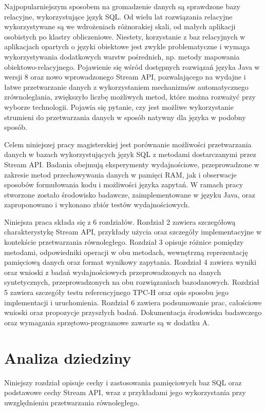 \documentclass[12pt,twoside,openright]{extarticle}
\begin{document}
    Najpopularniejszym sposobem na gromadzenie danych są sprawdzone bazy relacyjne, wykorzystujące język SQL. Od wielu lat rozwiązania relacyjne wykorzystywane są we wdrożeniach różnorakiej skali, od małych aplikacji osobistych po klastry obliczeniowe. Niestety, korzystanie z baz relacyjnych w aplikacjach opartych o języki obiektowe jest zwykle problematyczne i wymaga wykorzystywania dodatkowych warstw pośrednich, np. metody mapowania obiektowo-relacyjnego. Pojawienie się wśród dostępnych rozwiązań języka Java w wersji 8 oraz nowo wprowadzonego Stream API, pozwalającego na wydajne i łatwe przetwarzanie danych z wykorzystaniem mechanizmów automatycznego zrównoleglania, zwiększyło liczbę możliwych metod, które można rozważyć przy wyborze technologii. Pojawia się pytanie, czy jest możliwe wykorzystanie strumieni do przetwarzania danych w sposób natywny dla języka w podobny sposób.

	Celem niniejszej pracy magisterskiej jest porównanie możliwości przetwarzania danych w bazach wykorzystujących język SQL z metodami dostarczanymi przez Stream API. Badania obejmują eksperymenty wydajnościowe, przeprowadzone w zakresie metod przechowywania danych w pamięci RAM, jak i obserwacje sposobów formułowania kodu i możliwości języka zapytań. W ramach pracy stworzone zostało środowisko badawcze, zaimplementowane w języku Java, oraz zaproponowano i wykonano zbiór testów wydajnościowych.

    Niniejsza praca składa się z 6 rozdziałów. Rozdział 2 zawiera szczegółową charakterystykę Stream API, przykłady użycia oraz szczegóły implementacyjne w kontekście przetwarzania równoległego. Rozdział 3 opisuje różnice pomiędzy metodami, odpowiedniki operacji w obu metodach, wewnętrzną reprezentację pamięciową danych oraz format wynikowy zapytania. Rozdział 4 zawiera wyniki oraz wnioski z badań wydajnościowych przeprowadzonych na danych syntetycznych, przeprowadzonych na obu rozwiązaniach bazodanowych. Rozdział 5 zawiera szczegóły testu referencyjnego TPC-H oraz opis sposobu jego implementacji i uruchomienia. Rozdział 6 zawiera podsumowanie prac, całościowe wnioski oraz propozycje przyszłych badań. Dokumentacja środowiska badawczego oraz wymagania sprzętowo-programowe zawarte są w dodatku A.

\section{Analiza dziedziny}
    Niniejszy rozdział opisuje cechy i zastosowania pamięciowych baz SQL oraz podstawowe cechy Stream API, wraz z przykładami jego wykorzystania przy uwzględnieniu przetwarzania równoległego.
\end{document}
